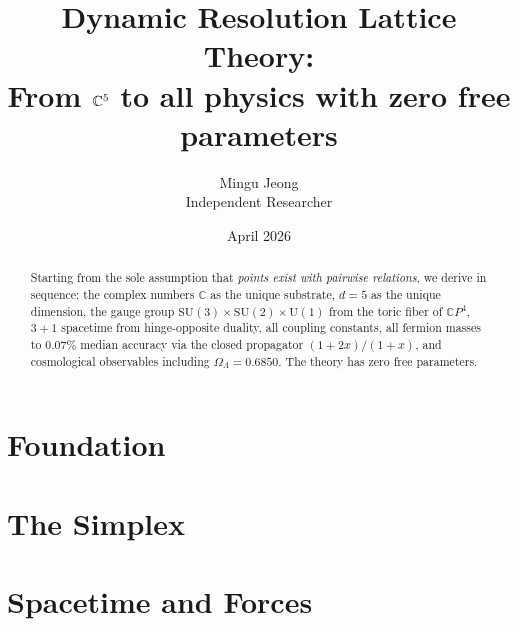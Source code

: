\documentclass[12pt]{article}
\title{Dynamic Resolution Lattice Theory:\\[6pt]
\large From $\CC^5$ to all physics with zero free parameters}
\author{Mingu Jeong\\Independent Researcher}
\date{April 2026}
\theoremstyle{remark}
\theoremstyle{definition}
\newcommand{\CP}{\mathbb{C}P}
\newcommand{\CC}{\mathbb{C}}
\begin{document}
\maketitle

\begin{abstract}
Starting from the sole assumption that \emph{points exist with pairwise
relations}, we derive in sequence: the complex numbers $\CC$ as the
unique substrate, $d = 5$ as the unique dimension, the gauge group
$\mathrm{SU}(3)\times\mathrm{SU}(2)\times\mathrm{U}(1)$ from the
toric fiber of $\CP^4$, $3+1$ spacetime from hinge-opposite duality,
all coupling constants, all fermion masses to $0.07\%$ median accuracy
via the closed propagator $(1+2x)/(1+x)$, and cosmological observables
including $\Omega_\Lambda = 0.6850$.  The theory has zero free parameters.
\end{abstract}

\tableofcontents
\newpage

\part{Foundation}







\part{The Simplex}





\part{Spacetime and Forces}
\end{document}

